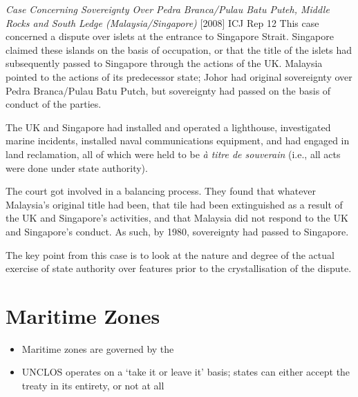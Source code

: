\begin{casedetails}{\textit{Case Concerning Sovereignty Over Pedra Branca/Pulau Batu Puteh, Middle Rocks and South Ledge (Malaysia/Singapore)} [2008] ICJ Rep 12}
    \flushleft
    This case concerned a dispute over islets at the entrance to Singapore Strait. Singapore claimed these islands on the basis of occupation, or that the title of the islets had subsequently passed to Singapore through the actions of the UK. Malaysia pointed to the actions of its predecessor state; Johor had original sovereignty over Pedra Branca/Pulau Batu Putch, but sovereignty had passed on the basis of conduct of the parties.

    \vspace{\baselineskip}

    The UK and Singapore had installed and operated a lighthouse, investigated marine incidents, installed naval communications equipment, and had engaged in land reclamation, all of which were held to be \textit{à titre de souverain} (i.e., all acts were done under state authority).

    \vspace{\baselineskip}

    The court got involved in a balancing process. They found that whatever Malaysia's original title had been, that tile had been extinguished as a result of the UK and Singapore's activities, and that Malaysia did not respond to the UK and Singapore's conduct. As such, by 1980, sovereignty had passed to Singapore. 
    
    \vspace{\baselineskip}
    
    The key point from this case is to look at the nature and degree of the actual exercise of state authority over features prior to the crystallisation of the dispute.
\end{casedetails}

\section{Maritime Zones}
\begin{itemize}
    \item Maritime zones are governed by the 
    \item UNCLOS operates on a `take it or leave it' basis; states can either accept the treaty in its entirety, or not at all
\end{itemize}

